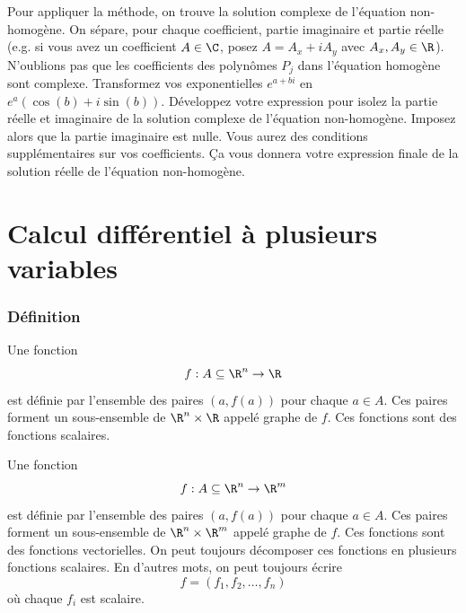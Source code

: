 \begin{itemize}
		Pour appliquer la méthode, on trouve la solution complexe de l'équation non-homogène.
		On sépare, pour chaque coefficient, partie imaginaire et partie réelle
		(e.g. si vous avez un coefficient $A \in \C$, posez $A = A_x + iA_y$ avec $A_x, A_y \in \R$).
		N'oublions pas que les coefficients des polynômes $P_j$ dans l'équation homogène sont complexe.
		Transformez vos exponentielles $e^{a + bi}$ en $e^a(\cos(b) + i\sin(b))$.
		Développez votre expression pour isolez la partie réelle et imaginaire de la solution complexe de l'équation non-homogène.
		Imposez alors que la partie imaginaire est nulle.
		Vous aurez des conditions supplémentaires sur vos coefficients.
		Ça vous donnera votre expression finale de la solution réelle de l'équation non-homogène.
\end{itemize}


\part{Calcul différentiel à plusieurs variables}

\section{Définition}


\begin{mydef}
	Une fonction
	\[ f : A \subseteq \R^n \rightarrow \R \]
	est définie par l'ensemble des paires $(a,f(a))$ pour chaque $a \in A$. Ces paires forment un sous-ensemble de $\R^n \times \R$ appelé graphe de $f$. Ces fonctions sont des fonctions scalaires.

	Une fonction
	\[ f : A \subseteq \R^n \rightarrow \R^m \]
	est définie par l'ensemble des paires $(a,f(a))$ pour chaque $a \in A$. Ces paires forment un sous-ensemble de $\R^n \times \R^m$ appelé graphe de $f$. Ces fonctions sont des fonctions vectorielles. On peut toujours décomposer ces fonctions en plusieurs fonctions scalaires. En d'autres mots, on peut toujours écrire
	\[ f = (f_1, f_2, \dots, f_n) \]
	où chaque $f_i$ est scalaire.
\end{mydef}


